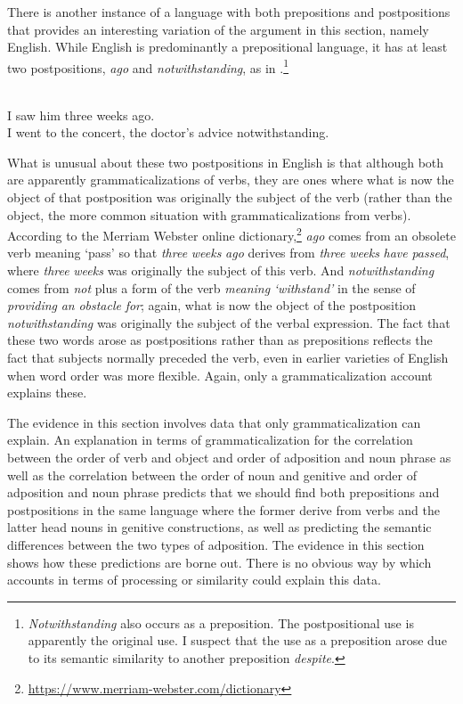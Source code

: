 \documentclass[output=paper]{langsci/langscibook}
\begin{document}
There is another instance of a language with both prepositions and postpositions that provides an interesting variation of the argument in this section, namely English. While English is predominantly a prepositional language, it has at least two postpositions, \textit{ago} and \textit{notwithstanding}, as in .\footnote{\textit{Notwithstanding} also occurs as a preposition. The postpositional use is apparently the original use. I suspect that the use as a preposition arose due to its semantic similarity to another preposition \textit{despite}.}

\ea\label{ex:dryer:36}
\\
\ea  I saw him three weeks ago.\\
\ex  I went to the concert, the doctor’s advice notwithstanding.\\
\z
\z

What is unusual about these two postpositions in English is that although both are apparently grammaticalizations of verbs, they are ones where what is now the object of that postposition was originally the subject of the verb (rather than the object, the more common situation with grammaticalizations from verbs). According to the Merriam Webster online dictionary,\footnote{\url{https://www.merriam-webster.com/dictionary}} \textit{ago} comes from an obsolete verb meaning ‘pass’ so that \textit{three} \textit{weeks} \textit{ago}  derives from \textit{three} \textit{weeks} \textit{have} \textit{passed}, where \textit{three} \textit{weeks} was originally the subject of this verb. And \textit{notwithstanding} comes from \textit{not} plus a form of the verb \textit{meaning} \textit{‘withstand’} in the sense of \textit{providing} \textit{an} \textit{obstacle} \textit{for}; again, what is now the object of the postposition \textit{notwithstanding} was originally the subject of the verbal expression. The fact that these two words arose as postpositions rather than as prepositions reflects the fact that subjects normally preceded the verb, even in earlier varieties of English when word order was more flexible. Again, only a grammaticalization account explains these.

The evidence in this section involves data that only grammaticalization can explain. An explanation in terms of grammaticalization for the correlation between the order of verb and object and order of adposition and noun phrase as well as the correlation between the order of noun and genitive and order of adposition and noun phrase predicts that we should find both prepositions and postpositions in the same language where the former derive from verbs and the latter head nouns in genitive constructions, as well as predicting the semantic differences between the two types of adposition. The evidence in this section shows how these predictions are borne out. There is no obvious way by which accounts in terms of processing or similarity could explain this data.
\end{document}

